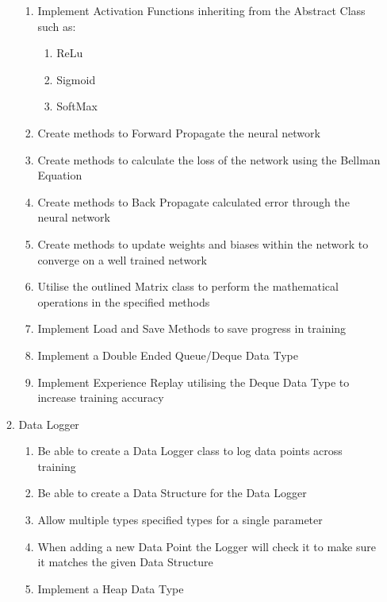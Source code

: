 \begin{flushleft}
\begin{enumerate}
\begin{enumerate}
\begin{enumerate}
                        \item Implement Activation Functions inheriting from the Abstract Class such as:
                        \begin{enumerate}
                            \item ReLu
                            \item Sigmoid
                            \item SoftMax
                        \end{enumerate}
                        \item Create methods to Forward Propagate the neural network
                        \item Create methods to calculate the loss of the network using the Bellman Equation
                        \item Create methods to Back Propagate calculated error through the neural network
                        \item Create methods to update weights and biases within the network to converge on a well trained network
                        \item Utilise the outlined Matrix class to perform the mathematical operations in the specified methods
                        \item Implement Load and Save Methods to save progress in training
                        \item Implement a Double Ended Queue/Deque Data Type
                        \item Implement Experience Replay utilising the Deque Data Type to increase training accuracy
                    \end{enumerate}   
                \item Data Logger
                    \begin{enumerate}
                        \item Be able to create a Data Logger class to log data points across training
                        \item Be able to create a Data Structure for the Data Logger
                        \item Allow multiple types specified types for a single parameter
                        \item When adding a new Data Point the Logger will check it to make sure it matches the given Data Structure
                        \item Implement a Heap Data Type

\end{enumerate}
\end{enumerate}
\end{enumerate}
\end{flushleft}
